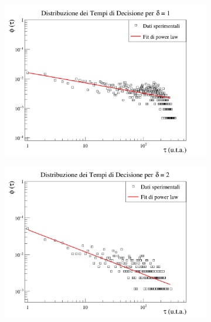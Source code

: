 \documentclass[letterpaper,10pt]{article}
\begin{document}
\begin{figure}[h]
\centering
\begin{subfigure}{0.8\textwidth}
\includegraphics[width=\linewidth]{Immagini/time_graph_d1.png}
\end{subfigure}
\begin{subfigure}{0.8\textwidth}
\includegraphics[width=\linewidth]{Immagini/time_graph_d2.png}
\end{subfigure}
\end{figure}
\end{document}
